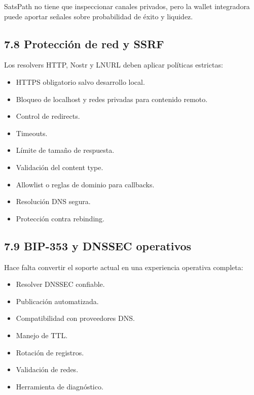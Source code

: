 \documentclass[
]{article}
\providecommand{\tightlist}{%
  \setlength{\itemsep}{0pt}\setlength{\parskip}{0pt}}
\begin{document}
SatsPath no tiene que inspeccionar canales privados, pero la wallet
integradora puede aportar señales sobre probabilidad de éxito y
liquidez.

\hypertarget{protecciuxf3n-de-red-y-ssrf}{%
\subsection{7.8 Protección de red y
SSRF}\label{protecciuxf3n-de-red-y-ssrf}}

Los resolvers HTTP, Nostr y LNURL deben aplicar políticas estrictas:

\begin{itemize}
\tightlist
\item
  HTTPS obligatorio salvo desarrollo local.
\item
  Bloqueo de localhost y redes privadas para contenido remoto.
\item
  Control de redirects.
\item
  Timeouts.
\item
  Límite de tamaño de respuesta.
\item
  Validación del content type.
\item
  Allowlist o reglas de dominio para callbacks.
\item
  Resolución DNS segura.
\item
  Protección contra rebinding.
\end{itemize}

\hypertarget{bip-353-y-dnssec-operativos}{%
\subsection{7.9 BIP-353 y DNSSEC
operativos}\label{bip-353-y-dnssec-operativos}}

Hace falta convertir el soporte actual en una experiencia operativa
completa:

\begin{itemize}
\tightlist
\item
  Resolver DNSSEC confiable.
\item
  Publicación automatizada.
\item
  Compatibilidad con proveedores DNS.
\item
  Manejo de TTL.
\item
  Rotación de registros.
\item
  Validación de redes.
\item
  Herramienta de diagnóstico.
\end{itemize}
\end{document}
